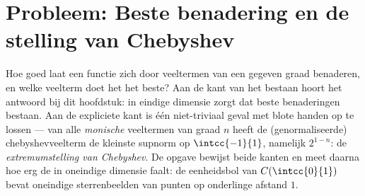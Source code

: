 \section{Probleem: Beste benadering en de stelling van Chebyshev}

Hoe goed laat een functie zich door veeltermen van een gegeven
graad benaderen, en welke veelterm doet het het beste? Aan de kant
van het bestaan hoort het antwoord bij dit hoofdstuk: 
in eindige dimensie zorgt dat beste benaderingen bestaan. Aan de
expliciete kant is één niet-triviaal geval  met blote
handen op te lossen --- van alle \emph{monische} veeltermen van
graad $n$ heeft de (genormaliseerde) chebyshevveelterm de kleinste
supnorm op $\intcc{-1}{1}$, namelijk $2^{1-n}$: de
\emph{extremumstelling van Chebyshev}. De opgave bewijst beide
kanten en meet daarna hoe erg de  in oneindige dimensie
faalt: de eenheidsbol van $C(\intcc{0}{1})$ bevat oneindige
sterrenbeelden van punten op onderlinge afstand $1$.

